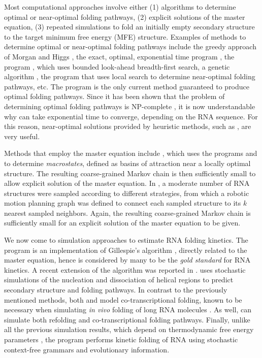 Most computational approaches involve either (1) algorithms to
determine optimal or near-optimal folding pathways, (2) explicit
solutions of the master equation, (3) repeated simulations to fold an
initially empty secondary structure to the target minimum free energy
(MFE) structure. Examples of methods to determine optimal or
near-optimal folding pathways include the greedy approach of Morgan
and Higgs \citep{morganhiggsbarrier}, the exact, optimal, exponential
time program \barriers \citep{flammhofacker}, the program
 \citep{flamm.r01}, which uses bounded look-ahead
breadth-first search, a genetic algorithm \citep{shapiro.jmb01}, the
program  that uses local search to determine
near-optimal folding pathways, etc. The program \barriers
\citep{flammhofacker} is the only current method guaranteed to
produce optimal folding pathways. Since it has been shown that
the problem of determining optimal folding pathways is
NP-complete \citep{thachuk.psb10}, it is now understandable why
 can take exponential time to converge, depending
on the RNA sequence. For this reason, near-optimal solutions
provided by heuristic methods, such as , are very useful.

Methods that employ the master equation include 
\citep{wolfingerstadler:kinetics}, which uses the programs
 \citep{wuchtyfontanahofackerschuster} and \barriers
\citep{flammhofacker} to determine {\em macrostates}, defined as basins
of attraction near a locally optimal structure. The resulting
coarse-grained Markov chain is then sufficiently small to allow explicit
solution of the master equation. In \citep{tang.jcb05}, a moderate
number of RNA structures were sampled according to different
strategies, from which a robotic motion planning graph was defined
to connect each sampled structure to its $k$ nearest sampled
neighbors. Again, the resulting coarse-grained Markov chain is
sufficiently small for an explicit solution of the master equation to
be given.

We now come to simulation approaches to estimate RNA folding kinetics.
The program \kinfold \citep{flammphd,flamm} is an implementation
of Gillespie's algorithm \citep{gillespiestochasticsimulation1},
directly related to the master equation, hence is considered by many
to be the {\em gold standard} for RNA kinetics. A recent extension of the
\kinfold algorithm was reported in \citep{aviram.amb12}.
 \citep{xayaphoummine.nar05} uses stochastic simulations of
the nucleation and dissociation of helical regions to predict
secondary structure and folding pathways. In contrast to the
previously mentioned methods, both 
\citep{danilova.jbcb06} and  \citep{geis.jmb08} model
co-transcriptional folding, known to be necessary when simulating
{\em in vivo} folding of long RNA molecules \citep{lai.r13}. As well,
 can simulate both refolding and co-transcriptional folding
pathways. Finally, unlike all the previous simulation results, which
depend on thermodynamic free energy parameters \citep{turner.nar10},
the program  \citep{anderson.b13} performs kinetic folding
of RNA using stochastic context-free grammars and evolutionary
information.

